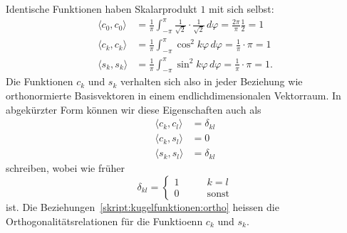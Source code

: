 Identische Funktionen haben Skalarprodukt $1$ mit sich selbst:
\begin{align*}
\langle c_0,c_0\rangle
&=
\frac1{\pi}\int_{-\pi}^{\pi}
\frac1{\sqrt{2}}
\cdot
\frac1{\sqrt{2}}
\,d\varphi = \frac{2\pi}{\pi}\frac12=1
\\
\langle c_k,c_k\rangle
&=
\frac1{\pi}
\int_{-\pi}^{\pi}
\cos^2 k\varphi
\,d\varphi
=
\frac1{\pi}\cdot\pi = 1
\\
\langle s_k,s_k\rangle
&=
\frac1{\pi}
\int_{-\pi}^\pi
\sin^2 k\varphi
\,d\varphi
=\frac1{\pi}\cdot\pi = 1.
\end{align*}
Die Funktionen $c_k$ und $s_k$ verhalten sich also in jeder Beziehung
wie orthonormierte Basisvektoren in einem endlichdimensionalen Vektorraum.
In abgekürzter Form können wir diese Eigenschaften auch als
\begin{equation}
\begin{aligned}
\langle c_k,c_l\rangle
&=
\delta_{kl}
\\
\langle c_k,s_l\rangle
&=0
\\
\langle s_k,s_l\rangle
&=
\delta_{kl}
\end{aligned}
\label{skript:kugelfunktionen:ortho}
\end{equation}
schreiben, wobei wie früher
\[
\delta_{kl}=\begin{cases}
1&\qquad k=l\\
0&\qquad\text{sonst}
\end{cases}
\]
ist.
Die Beziehungen~\eqref{skript:kugelfunktionen:ortho} heissen die
Orthogonalitätsrelationen für die Funktioenn $c_k$ und $s_k$.

